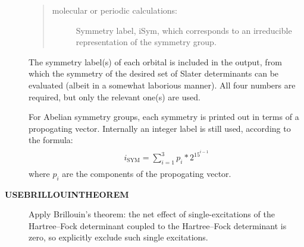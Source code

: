 \documentclass[openany,a4paper,10pt]{manual}
\begin{document}
\begin{description}
\begin{quote}
\begin{description}
\item[molecular or periodic calculations:]
Symmetry label, iSym, which corresponds to an irreducible
representation of the symmetry group.

\end{description}
\end{quote}

The symmetry label(s) of each orbital is included in the output,
from which the symmetry of the desired set of Slater determinants
can be evaluated (albeit in a somewhat laborious manner). All four
numbers are required, but only the relevant one(s) are used.

For Abelian symmetry groups, each symmetry is printed out in terms of
a propogating vector.  Internally an integer label is still used, according to
the formula:
\begin{align}\begin{split}i_{\textrm{SYM}} = \sum_{i=1}^3 p_i * 2^{15^{i-1}}\end{split}\end{align}
where $p_i$ are the components of the propogating vector.

\item[\textbf{USEBRILLOUINTHEOREM}]
Apply Brillouin's theorem: the net effect of single-excitations of
the Hartree--Fock determinant coupled to the Hartree--Fock determinant
is zero, so explicitly exclude such single excitations.

\end{description}
\end{document}
